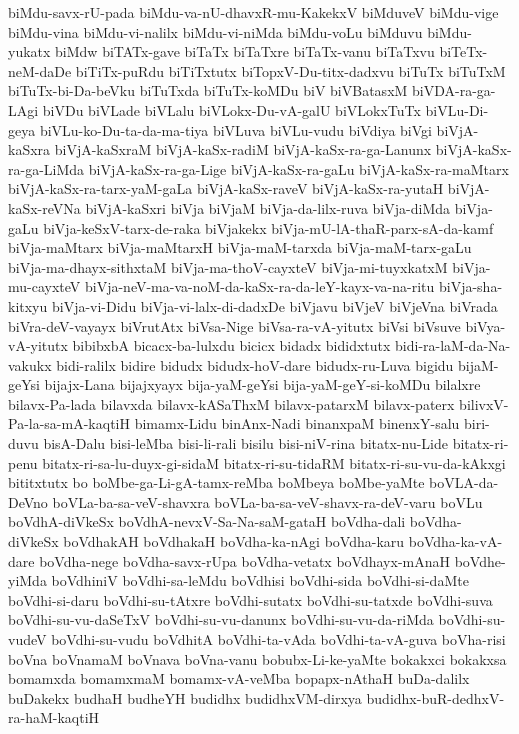 {biMdu-savx-rU-pada
biMdu-va-nU-dhavxR-mu-KakekxV
biMduveV
biMdu-vige
biMdu-vina
biMdu-vi-nalilx
biMdu-vi-niMda
biMdu-voLu
biMduvu
biMdu-yukatx
biMdw
biTATx-gave
biTaTx
biTaTxre
biTaTx-vanu
biTaTxvu
biTeTx-neM-daDe
biTiTx-puRdu
biTiTxtutx
biTopxV-Du-titx-dadxvu
biTuTx
biTuTxM
biTuTx-bi-Da-beVku
biTuTxda
biTuTx-koMDu
biV
biVBatasxM
biVDA-ra-ga-LAgi
biVDu
biVLade
biVLalu
biVLokx-Du-vA-galU
biVLokxTuTx
biVLu-Di-geya
biVLu-ko-Du-ta-da-ma-tiya
biVLuva
biVLu-vudu
biVdiya
biVgi
biVjA-kaSxra
biVjA-kaSxraM
biVjA-kaSx-radiM
biVjA-kaSx-ra-ga-Lanunx
biVjA-kaSx-ra-ga-LiMda
biVjA-kaSx-ra-ga-Lige
biVjA-kaSx-ra-gaLu
biVjA-kaSx-ra-maMtarx
biVjA-kaSx-ra-tarx-yaM-gaLa
biVjA-kaSx-raveV
biVjA-kaSx-ra-yutaH
biVjA-kaSx-reVNa
biVjA-kaSxri
biVja
biVjaM
biVja-da-lilx-ruva
biVja-diMda
biVja-gaLu
biVja-keSxV-tarx-de-raka
biVjakekx
biVja-mU-lA-thaR-parx-sA-da-kamf
biVja-maMtarx
biVja-maMtarxH
biVja-maM-tarxda
biVja-maM-tarx-gaLu
biVja-ma-dhayx-sithxtaM
biVja-ma-thoV-cayxteV
biVja-mi-tuyxkatxM
biVja-mu-cayxteV
biVja-neV-ma-va-noM-da-kaSx-ra-da-leY-kayx-va-na-ritu
biVja-sha-kitxyu
biVja-vi-Didu
biVja-vi-lalx-di-dadxDe
biVjavu
biVjeV
biVjeVna
biVrada
biVra-deV-vayayx
biVrutAtx
biVsa-Nige
biVsa-ra-vA-yitutx
biVsi
biVsuve
biVya-vA-yitutx
bibibxbA
bicacx-ba-lulxdu
bicicx
bidadx
bididxtutx
bidi-ra-laM-da-Na-vakukx
bidi-ralilx
bidire
bidudx
bidudx-hoV-dare
bidudx-ru-Luva
bigidu
bijaM-geYsi
bijajx-Lana
bijajxyayx
bija-yaM-geYsi
bija-yaM-geY-si-koMDu
bilalxre
bilavx-Pa-lada
bilavxda
bilavx-kASaThxM
bilavx-patarxM
bilavx-paterx
bilivxV-Pa-la-sa-mA-kaqtiH
bimamx-Lidu
binAnx-Nadi
binanxpaM
binenxY-salu
biri-duvu
bisA-Dalu
bisi-leMba
bisi-li-rali
bisilu
bisi-niV-rina
bitatx-nu-Lide
bitatx-ri-penu
bitatx-ri-sa-lu-duyx-gi-sidaM
bitatx-ri-su-tidaRM
bitatx-ri-su-vu-da-kAkxgi
bititxtutx
bo
boMbe-ga-Li-gA-tamx-reMba
boMbeya
boMbe-yaMte
boVLA-da-DeVno
boVLa-ba-sa-veV-shavxra
boVLa-ba-sa-veV-shavx-ra-deV-varu
boVLu
boVdhA-diVkeSx
boVdhA-nevxV-Sa-Na-saM-gataH
boVdha-dali
boVdha-diVkeSx
boVdhakAH
boVdhakaH
boVdha-ka-nAgi
boVdha-karu
boVdha-ka-vA-dare
boVdha-nege
boVdha-savx-rUpa
boVdha-vetatx
boVdhayx-mAnaH
boVdhe-yiMda
boVdhiniV
boVdhi-sa-leMdu
boVdhisi
boVdhi-sida
boVdhi-si-daMte
boVdhi-si-daru
boVdhi-su-tAtxre
boVdhi-sutatx
boVdhi-su-tatxde
boVdhi-suva
boVdhi-su-vu-daSeTxV
boVdhi-su-vu-danunx
boVdhi-su-vu-da-riMda
boVdhi-su-vudeV
boVdhi-su-vudu
boVdhitA
boVdhi-ta-vAda
boVdhi-ta-vA-guva
boVha-risi
boVna
boVnamaM
boVnava
boVna-vanu
bobubx-Li-ke-yaMte
bokakxci
bokakxsa
bomamxda
bomamxmaM
bomamx-vA-veMba
bopapx-nAthaH
buDa-dalilx
buDakekx
budhaH
budheYH
budidhx
budidhxVM-dirxya
budidhx-buR-dedhxV-ra-haM-kaqtiH
}
